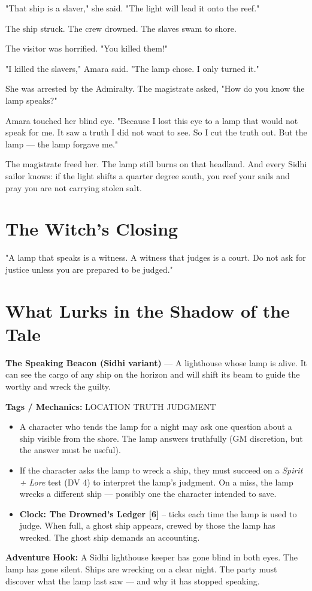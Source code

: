 \documentclass[10pt,twoside]{book}
\newcommand{\tag}[1]{\textsc{#1}}
\begin{document}
"That ship is a slaver," she said. "The light will lead it onto the reef."

The ship struck. The crew drowned. The slaves swam to shore.

The visitor was horrified. "You killed them!"

"I killed the slavers," Amara said. "The lamp chose. I only turned it."

She was arrested by the Admiralty. The magistrate asked, "How do you know the lamp speaks?"

Amara touched her blind eye. "Because I lost this eye to a lamp that would not speak for me. It saw a truth I did not want to see. So I cut the truth out. But the lamp --- the lamp forgave me."

The magistrate freed her. The lamp still burns on that headland. And every Sidhi sailor knows: if the light shifts a quarter degree south, you reef your sails and pray you are not carrying stolen salt.

\section*{The Witch's Closing}
"A lamp that speaks is a witness. A witness that judges is a court. Do not ask for justice unless you are prepared to be judged."

\section*{What Lurks in the Shadow of the Tale}
\begin{infobox}
\textbf{The Speaking Beacon (Sidhi variant)} --- A lighthouse whose lamp is alive. It can see the cargo of any ship on the horizon and will shift its beam to guide the worthy and wreck the guilty.

\textbf{Tags / Mechanics:} \tag{LOCATION} \tag{TRUTH} \tag{JUDGMENT}

\begin{itemize}
\item A character who tends the lamp for a night may ask one question about a ship visible from the shore. The lamp answers truthfully (GM discretion, but the answer must be useful).
\item If the character asks the lamp to wreck a ship, they must succeed on a \textit{Spirit + Lore} test (DV 4) to interpret the lamp's judgment. On a miss, the lamp wrecks a different ship --- possibly one the character intended to save.
\item \textbf{Clock: The Drowned's Ledger [6]} -- ticks each time the lamp is used to judge. When full, a ghost ship appears, crewed by those the lamp has wrecked. The ghost ship demands an accounting.
\end{itemize}

\textbf{Adventure Hook:} A Sidhi lighthouse keeper has gone blind in both eyes. The lamp has gone silent. Ships are wrecking on a clear night. The party must discover what the lamp last saw --- and why it has stopped speaking.
\end{infobox}
\end{document}
